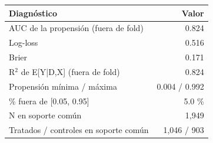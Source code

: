 \begin{tabular}{lr}
\toprule
Diagnóstico & Valor \\
\midrule
AUC de la propensión (fuera de fold) & 0.824 \\
Log-loss & 0.516 \\
Brier & 0.171 \\
R$^2$ de E[Y|D,X] (fuera de fold) & 0.824 \\
Propensión mínima / máxima & 0.004 / 0.992 \\
\% fuera de [0.05, 0.95] & 5.0 \% \\
N en soporte común & 1,949 \\
Tratados / controles en soporte común & 1,046 / 903 \\
\bottomrule
\end{tabular}